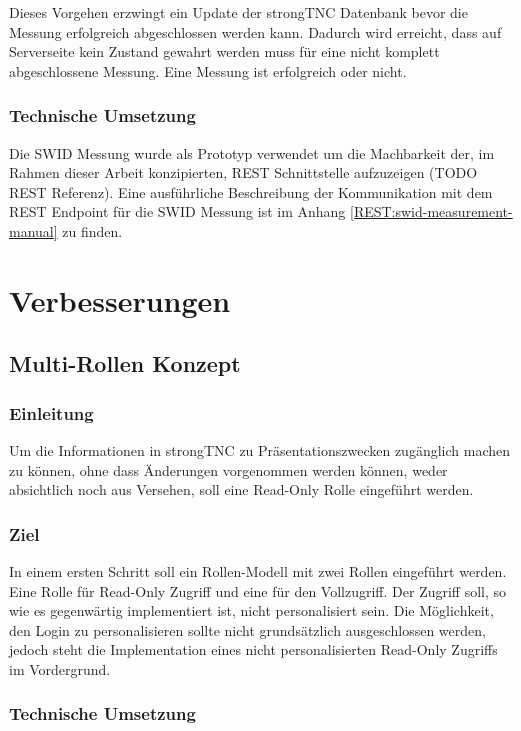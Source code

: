 Dieses Vorgehen erzwingt ein Update der strongTNC Datenbank bevor die Messung erfolgreich abgeschlossen werden kann. Dadurch wird erreicht, dass auf Serverseite kein Zustand gewahrt werden muss für eine nicht komplett abgeschlossene Messung. Eine Messung ist erfolgreich oder nicht.
\subsubsection{Technische Umsetzung}
Die SWID Messung wurde als Prototyp verwendet um die Machbarkeit der, im Rahmen dieser Arbeit konzipierten, \gls{REST} Schnittstelle aufzuzeigen (TODO REST Referenz). Eine ausführliche Beschreibung der Kommunikation mit dem REST Endpoint für die SWID Messung ist im Anhang \ref{REST:swid-measurement-manual} zu finden.

\section{Verbesserungen}

\subsection{Multi-Rollen Konzept}

\subsubsection{Einleitung}

Um die Informationen in strongTNC zu Präsentationszwecken zugänglich machen zu können, 
ohne dass Änderungen vorgenommen werden können, weder absichtlich noch aus Versehen, 
soll eine Read-Only Rolle eingeführt werden.


\subsubsection{Ziel}
In einem ersten Schritt soll ein Rollen-Modell mit zwei Rollen eingeführt werden. 
Eine Rolle für Read-Only Zugriff und eine für den Vollzugriff. Der Zugriff soll, 
so wie es gegenwärtig implementiert ist, nicht personalisiert sein. Die Möglichkeit, 
den Login zu personalisieren sollte nicht grundsätzlich ausgeschlossen werden, jedoch 
steht die Implementation eines nicht personalisierten Read-Only Zugriffs im Vordergrund.


\subsubsection{Technische Umsetzung}

